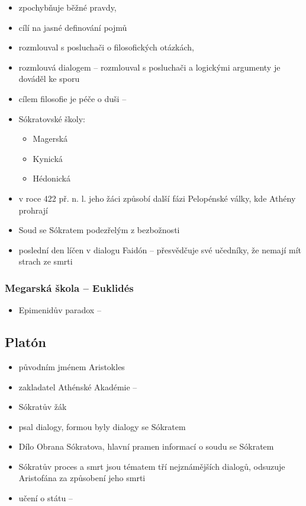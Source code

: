 \documentclass[11pt,a4paper,czech]{article}
\begin{document}
    \begin{itemize}
        \item zpochybňuje běžné pravdy,
        \item cílí na jasné definování pojmů
        \item rozmlouval s posluchači o filosofických otázkách,
        \item rozmlouvá dialogem -- rozmlouval s posluchači a logickými argumenty je dováděl ke sporu
        \item cílem filosofie je péče o duši -- 
        \item Sókratovské školy:
            \begin{itemize}
                \item Magerská
                \item Kynická
                \item Hédonická
            \end{itemize}
        \item v roce 422 př. n. l. jeho žáci způsobí další fázi Pelopénské války, kde Athény prohrají
        \item Soud se Sókratem podezřelým z bezbožnosti
        \item poslední den líčen v dialogu Faidón -- přesvědčuje své učedníky, že nemají mít strach ze smrti
    \end{itemize}

    \subsubsection{Megarská škola -- Euklidés}

    \begin{itemize}
        \item Epimenidův paradox -- 
    \end{itemize}

    \subsection{Platón}

    \begin{itemize}
        \item původním jménem Aristokles
        \item zakladatel Athénské Akadémie -- 
        \item Sókratův žák
        \item psal dialogy, formou byly dialogy se Sókratem
        \item Dílo Obrana Sókratova, hlavní pramen informací o soudu se Sókratem
        \item Sókratův proces a smrt jsou tématem tří nejznámějších dialogů, odsuzuje Aristofána za způsobení jeho smrti
        \item učení o státu -- 
    \end{itemize}
\end{document}
